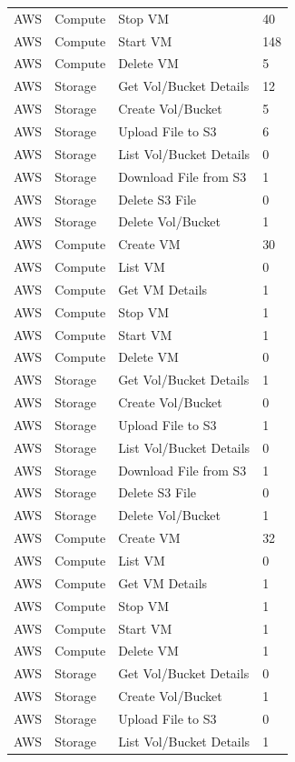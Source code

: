 \begin{table}[htb]
\begin{tabular} {p{3cm}|p{3cm}|p{5cm}|p{3cm}}
AWS & Compute & Stop VM & 40  \\
AWS & Compute & Start VM & 148  \\
AWS & Compute & Delete VM & 5  \\
AWS & Storage & Get Vol/Bucket Details & 12  \\
AWS & Storage & Create Vol/Bucket & 5  \\
AWS & Storage & Upload File to S3 & 6  \\
AWS & Storage & List Vol/Bucket Details & 0  \\
AWS & Storage & Download File from S3 & 1  \\
AWS & Storage & Delete S3 File & 0  \\
AWS & Storage & Delete Vol/Bucket & 1  \\
AWS & Compute & Create VM & 30  \\
AWS & Compute & List VM & 0  \\
AWS & Compute & Get VM Details & 1  \\
AWS & Compute & Stop VM & 1  \\
AWS & Compute & Start VM & 1  \\
AWS & Compute & Delete VM & 0  \\
AWS & Storage & Get Vol/Bucket Details & 1  \\
AWS & Storage & Create Vol/Bucket & 0  \\
AWS & Storage & Upload File to S3 & 1  \\
AWS & Storage & List Vol/Bucket Details & 0  \\
AWS & Storage & Download File from S3 & 1  \\
AWS & Storage & Delete S3 File & 0  \\
AWS & Storage & Delete Vol/Bucket & 1  \\
AWS & Compute & Create VM & 32  \\
AWS & Compute & List VM & 0  \\
AWS & Compute & Get VM Details & 1  \\
AWS & Compute & Stop VM & 1  \\
AWS & Compute & Start VM & 1  \\
AWS & Compute & Delete VM & 1  \\
AWS & Storage & Get Vol/Bucket Details & 0  \\
AWS & Storage & Create Vol/Bucket & 1  \\
AWS & Storage & Upload File to S3 & 0  \\
AWS & Storage & List Vol/Bucket Details & 1  \\

\end{tabular}
\end{table}
